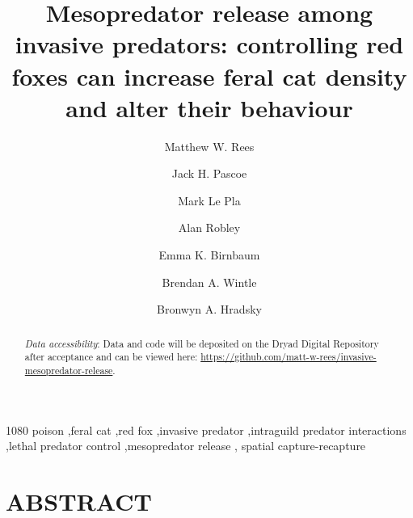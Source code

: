\documentclass[preprint, 3p, authoryear]{elsarticle} %
\begin{document}
\begin{frontmatter}

  \title{Mesopredator release among invasive predators: controlling red foxes can increase feral cat density and alter their behaviour}
    \author[UOM]{Matthew W. Rees}
    \author[UOM,CEC]{Jack H. Pascoe}
  
    \author[UOM,CEC]{Mark Le Pla}
  
    \author[ARI]{Alan Robley}
  
    \author[CEC]{Emma K. Birnbaum}
  
    \author[UOM]{Brendan A. Wintle}
  
    \author[UOM]{Bronwyn A. Hradsky}
  
  
  \begin{abstract}
  \emph{Data accessibility}: Data and code will be deposited on the Dryad Digital Repository after acceptance and can be viewed here: \href{https://github.com/matt-w-rees/invasive\%20-mesopredator-release}{https://github.com/matt-w-rees/invasive-mesopredator-release}.
  \end{abstract}
    \begin{keyword}
    1080 poison \sep feral cat \sep red fox \sep invasive predator \sep intraguild predator interactions \sep lethal predator control \sep mesopredator release \sep 
    spatial capture-recapture
  \end{keyword}
  
 \end{frontmatter}

\parskip=12pt

\newpage

\hypertarget{abstract}{%
\section*{ABSTRACT}\label{abstract}}
\end{document}
